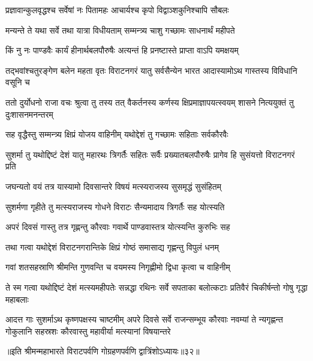 \twolineshloka
{प्रज्ञावान्कुलवृद्धश्च सर्वेषां नः पितामहः}
{आचार्यश्च कृपो विद्वाञ्शकुनिश्चापि सौबलः}


\twolineshloka
{मन्यन्ते ते यथा सर्वे तथा यात्रा विधीयताम्}
{सम्मन्त्र्य चाशु गच्छामः साधनार्थं महीपते}


\twolineshloka
{किं नु नः पाण्डवैः कार्यं हीनार्थबलपौरुषैः}
{अत्यन्तं हि प्रनष्टास्ते प्राप्ता वाऽपि यमक्षयम्}


\threelineshloka
{तद्भवांश्चतुरङ्गेण बलेन महता वृतः}
{विराटनगरं यातु सर्वसैन्येन भारत}
{आदास्यामोऽथ गास्तस्य विविधानि वसूनि च}



\threelineshloka
{ततो दुर्योधनो राजा वचः श्रुत्वा तु तस्य तत्}
{वैकर्तनस्य कर्णस्य क्षिप्रमाज्ञापयत्स्वयम्}
{शासने नित्ययुक्तं तु दुःशासनमनन्तरम्}




\twolineshloka
{सह वृद्धैस्तु सम्मन्त्र्य क्षिप्रं योजय वाहिनीम्}
{यथोद्देशं तु गच्छामः सहिताः सर्वकौरवैः}


\threelineshloka
{सुशर्मा तु यथोद्दिष्टं देशं यातु महारथः}
{त्रिगर्तैः सहितः सर्वैः प्रख्यातबलपौरुषैः}
{प्रागेव हि सुसंयत्तो विराटनगरं प्रति}


\twolineshloka
{जघन्यतो वयं तत्र यास्यामो दिवसान्तरे}
{विषयं मत्स्यराजस्य सुसमृद्धं सुसंहितम्}


\twolineshloka
{सुशर्मणा गृहीते तु मत्स्यराजस्य गोधने}
{विराटः सैन्यमादाय त्रिगर्तैः सह योत्स्यति}


\twolineshloka
{अपरं दिवसं गास्तु तत्र गृह्णन्तु कौरवाः}
{गवार्थे पाण्डवास्तत्र योत्स्यन्ति कुरुभिः सह}


\twolineshloka
{तथा गत्वा यथोद्देशं विराटनगरान्तिके}
{क्षिप्रं गोष्ठं समासाद्य गृह्णन्तु विपुलं धनम्}


\twolineshloka
{गवां शतसहस्राणि श्रीमन्ति गुणवन्ति च}
{वयमस्य निगृह्णीमो द्विधा कृत्वा च वाहिनीम्}



\threelineshloka
{ते स्म गत्वा यथोद्दिष्टं देशं मत्स्यमहीपतेः}
{सन्नद्धा रथिनः सर्वे सपताका बलोत्कटाः}
{प्रतिवैरं चिकीर्षन्तो गोषु गृद्धा महाबलाः}


\onelineshloka
{आदत्त गाः सुशर्माऽथ कृष्णपक्षस्य चाष्टमीम्}
\threelineshloka
{अपरे दिवसे सर्वे राजन्सम्भूय कौरवाः}
{नवम्यां ते न्यगृह्णन्त गोकुलानि सहस्रशः}
{कौरवास्तु महावीर्या मत्स्यानां विषयान्तरे}

॥इति श्रीमन्महाभारते विराटपर्वणि गोग्रहणपर्वणि द्वात्रिंशोऽध्यायः॥३२॥

